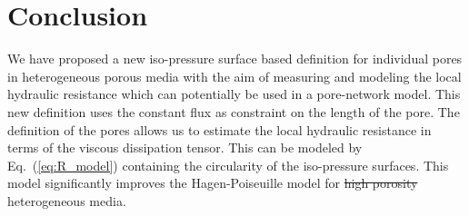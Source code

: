 \documentclass[draft]{agujournal2019}
\providecommand{\DIFdel}[1]{{\protect\color{red}\sout{#1}}}                      %
\providecommand{\DIFaddbegin}{} %
\providecommand{\DIFaddend}{} %
\providecommand{\DIFdelbegin}{} %
\providecommand{\DIFdelend}{} %
\begin{document}
\section{Conclusion}
We have proposed a new iso-pressure surface based definition for individual pores in heterogeneous porous media with the aim of measuring and modeling the local hydraulic resistance which can potentially be used in a pore-network model. This new definition uses the constant flux as constraint on the length of the pore. The definition of the pores allows us to estimate the local hydraulic resistance in terms of the viscous dissipation tensor. This can be modeled by Eq.~(\ref{eq:R_model}) containing the circularity of the iso-pressure surfaces. This model significantly improves the Hagen-Poiseuille model for \DIFdelbegin \DIFdel{high porosity }\DIFdelend heterogeneous media. 

\DIFdelbegin %
\DIFdelend \DIFaddbegin {}
\DIFaddend 




\end{document}
